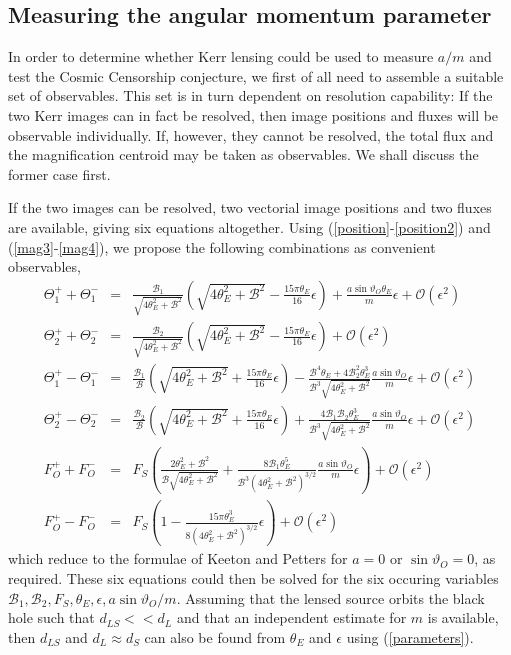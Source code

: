 \documentclass[prd,12pt,a4paper,showpacs]{revtex4}
\def\b{\mathcal{B}}
\def\bo{\b_1}
\def\bt{\b_2}
\def\t{\Theta}
\def\to{\t_1}
\def\tt{\t_2}
\begin{document}
\subsection{Measuring the angular momentum parameter}

In order to determine whether Kerr lensing could be used to 
measure $a/m$ and test the Cosmic Censorship conjecture, 
we first of all need to assemble a suitable set of observables. This 
set is in turn dependent on resolution capability: 
If the two Kerr images can in fact be resolved, then image positions and fluxes will be 
observable individually. If, however, they cannot be resolved, 
the total flux and the magnification centroid may be taken as observables. 
We shall discuss the former case first.

If the two images can be resolved, two vectorial image positions and two fluxes are available, 
giving six equations altogether. Using (\ref{position}-\ref{position2}) and (\ref{mag3}-\ref{mag4}), 
we propose the following combinations as convenient observables,
\begin{eqnarray}
\to^+ +\to^-&=&\frac{\bo}{\sqrt{4\theta_E^2+\b^2}}\left(\sqrt{4\theta_E^2+\b^2}
-\frac{15\pi\theta_E}{16}\epsilon\right)
+\frac{a\sin\vartheta_O\theta_E}{m}\epsilon +\mathcal{O}(\epsilon^2) 
\label{eq:newobservables-eqs1}\\
\tt^+ +\tt^-&=&\frac{\bt}{\sqrt{4\theta_E^2+\b^2}}\left(\sqrt{4\theta_E^2+\b^2}
-\frac{15\pi\theta_E}{16}\epsilon\right)+\mathcal{O}(\epsilon^2)\\
\to^+ -\to^-&=&\frac{\bo}{\b}\left(\sqrt{4\theta_E^2
+\b^2}+\frac{15\pi\theta_E}{16}\epsilon\right)
-\frac{\b^4\theta_E+4\bt^2\theta_E^3}{\b^3\sqrt{4\theta_E^2+\b^2}}\frac{a\sin\vartheta_O}{m}
\epsilon +\mathcal{O}(\epsilon^2) \\
\tt^+ -\tt^-&=&\frac{\bt}{\b}\left(\sqrt{4\theta_E^2+\b^2}+\frac{15\pi\theta_E}{16}
\epsilon\right)
+\frac{4\bo\bt\theta_E^3}{\b^3\sqrt{4\theta_E^2+\b^2}}\frac{a\sin\vartheta_O}{m}\epsilon 
+\mathcal{O}(\epsilon^2) \\
F_O^+ + F_O^-&=&F_S\left(\frac{2\theta_E^2+\b^2}{\b\sqrt{4\theta_E^2+\b^2}}+\frac{8\bo\theta_E^5}{\b^3(4\theta_E^2+\b^2)^{3/2}}\frac{a\sin\vartheta_O}{m}\epsilon\right)+\mathcal{O}(\epsilon^2)\\
F_O^+ - F_O^-&=&F_S\left(1-\frac{15\pi\theta_E^3}{8(4\theta_E^2+\b^2)^{3/2}}\epsilon\right)
+\mathcal{O}(\epsilon^2)
\label{eq:newobservables-eqs6}
\end{eqnarray}
which reduce to the formulae of Keeton and 
Petters \cite{keeton2} for $a=0$ or $\sin \vartheta_O=0$, as required. 
These six equations could then be solved for the six occuring variables $\bo,\bt,F_S,\theta_E,\epsilon,a\sin\vartheta_O/m$. Assuming that the lensed 
source orbits the black hole such that $d_{LS}<<d_L$ and that an independent estimate for $m$ is available, then $d_{LS}$ 
and $d_L \approx d_S$ can also be found from $\theta_E$ and $\epsilon$ using (\ref{parameters}). 
\end{document}
